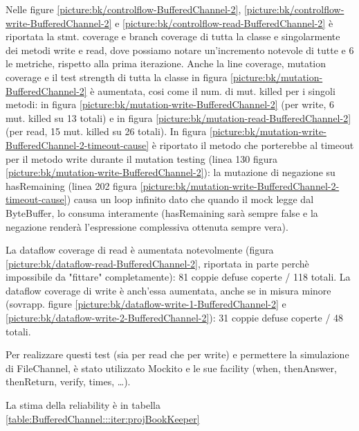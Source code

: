 \documentclass[10pt, a4paper]{article}
\newcommand{\gettablelabel}[5]{table:#1:#2:#3:iter#4:proj#5}
\newcommand{\getreltablelabel}[2]{\gettablelabel{#1}{}{}{}{#2}}
\newcommand{\getpicturelabel}[1]{picture:#1}
\def\bookkeeper{BookKeeper}
\begin{document}
	Nelle figure 
	\ref{\getpicturelabel{bk/controlflow-BufferedChannel-2}}, 
	\ref{\getpicturelabel{bk/controlflow-write-BufferedChannel-2}} e 
	\ref{\getpicturelabel{bk/controlflow-read-BufferedChannel-2}} è riportata la stmt.
	coverage e branch coverage di tutta la classe e singolarmente dei metodi write e read, dove possiamo notare
	un'incremento notevole di tutte e 6 le metriche, rispetto alla prima iterazione.
	Anche la line coverage, mutation coverage e il test strength di tutta la classe in figura
	\ref{\getpicturelabel{bk/mutation-BufferedChannel-2}} 
	è aumentata, cosi come il num. di mut. killed per i singoli metodi: in figura
	\ref{\getpicturelabel{bk/mutation-write-BufferedChannel-2}} (per write, 6 mut. killed su 13 totali) e in
	figura \ref{\getpicturelabel{bk/mutation-read-BufferedChannel-2}} (per read, 15 mut. killed su 26 totali).
	In figura \ref{\getpicturelabel{bk/mutation-write-BufferedChannel-2-timeout-cause}} è riportato il metodo
	che porterebbe al timeout per il metodo write durante il mutation testing (linea 130 figura
	\ref{\getpicturelabel{bk/mutation-write-BufferedChannel-2}}): la mutazione di negazione
	su hasRemaining (linea 202 figura \ref{\getpicturelabel{bk/mutation-write-BufferedChannel-2-timeout-cause}})
	causa un loop infinito dato che quando il mock legge dal ByteBuffer, lo consuma interamente (hasRemaining
	sarà sempre false e la negazione renderà l'espressione complessiva ottenuta sempre vera).
	
	La dataflow coverage di read è aumentata notevolmente (figura
	\ref{\getpicturelabel{bk/dataflow-read-BufferedChannel-2}}, 
	riportata in parte perchè impossibile da "fittare" completamente): 81 coppie defuse coperte / 118 totali.
	La dataflow coverage di write è anch'essa aumentata, anche se in misura minore (sovrapp. figure
	\ref{\getpicturelabel{bk/dataflow-write-1-BufferedChannel-2}} e
	\ref{\getpicturelabel{bk/dataflow-write-2-BufferedChannel-2}}): 31 coppie defuse coperte / 48 totali.
	
	Per realizzare questi test (sia per read che per write)
	e permettere la simulazione di FileChannel, è stato utilizzato Mockito e le
	sue facility (when, thenAnswer, thenReturn, verify, times, \dots).
	
	La stima della reliability è in tabella \ref{\getreltablelabel{BufferedChannel}{\bookkeeper}}

	\newpage
\end{document}
